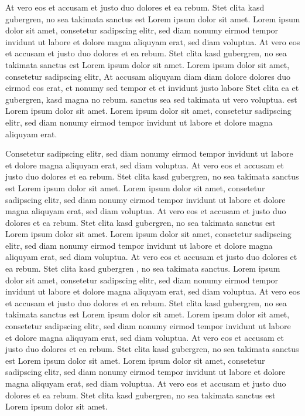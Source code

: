 At vero eos et accusam et justo duo dolores et ea rebum. Stet clita kasd gubergren, no sea takimata sanctus est Lorem
ipsum dolor sit amet. Lorem ipsum dolor sit amet, consetetur sadipscing elitr, sed diam nonumy eirmod tempor invidunt
ut labore et dolore magna aliquyam erat, sed diam voluptua. At vero eos et accusam et justo duo dolores et ea rebum.
Stet clita kasd gubergren, no sea takimata sanctus est Lorem ipsum dolor sit amet. Lorem ipsum dolor sit amet,
consetetur sadipscing elitr, At accusam aliquyam diam diam dolore dolores duo eirmod eos erat, et nonumy sed tempor
et et invidunt justo labore Stet clita ea et gubergren, kasd magna no rebum. sanctus sea sed takimata ut vero
voluptua. est Lorem ipsum dolor sit amet. Lorem ipsum dolor sit amet, consetetur sadipscing elitr, sed diam nonumy
eirmod tempor invidunt ut labore et dolore magna aliquyam erat.

Consetetur sadipscing elitr, sed diam nonumy eirmod tempor invidunt ut labore et dolore magna aliquyam erat, sed diam
voluptua. At vero eos et accusam et justo duo dolores et ea rebum. Stet clita kasd gubergren, no sea takimata sanctus
est Lorem ipsum dolor sit amet. Lorem ipsum dolor sit amet, consetetur sadipscing elitr, sed diam nonumy eirmod
tempor invidunt ut labore et dolore magna aliquyam erat, sed diam voluptua. At vero eos et accusam et justo duo
dolores et ea rebum. Stet clita kasd gubergren, no sea takimata sanctus est Lorem ipsum dolor sit amet. Lorem ipsum
dolor sit amet, consetetur sadipscing elitr, sed diam nonumy eirmod tempor invidunt ut labore et dolore magna
aliquyam erat, sed diam voluptua. At vero eos et accusam et justo duo dolores et ea rebum. Stet clita kasd gubergren
, no sea takimata sanctus. Lorem ipsum dolor sit amet, consetetur sadipscing elitr, sed diam nonumy eirmod tempor
invidunt ut labore et dolore magna aliquyam erat, sed diam voluptua. At vero eos et accusam et justo duo dolores et
ea rebum. Stet clita kasd gubergren, no sea takimata sanctus est Lorem ipsum dolor sit amet. Lorem ipsum dolor sit
amet, consetetur sadipscing elitr, sed diam nonumy eirmod tempor invidunt ut labore et dolore magna aliquyam erat,
sed diam voluptua. At vero eos et accusam et justo duo dolores et ea rebum. Stet clita kasd gubergren, no sea
takimata sanctus est Lorem ipsum dolor sit amet. Lorem ipsum dolor sit amet, consetetur sadipscing elitr, sed diam
nonumy eirmod tempor invidunt ut labore et dolore magna aliquyam erat, sed diam voluptua. At vero eos et accusam et
justo duo dolores et ea rebum. Stet clita kasd gubergren, no sea takimata sanctus est Lorem ipsum dolor sit amet.

